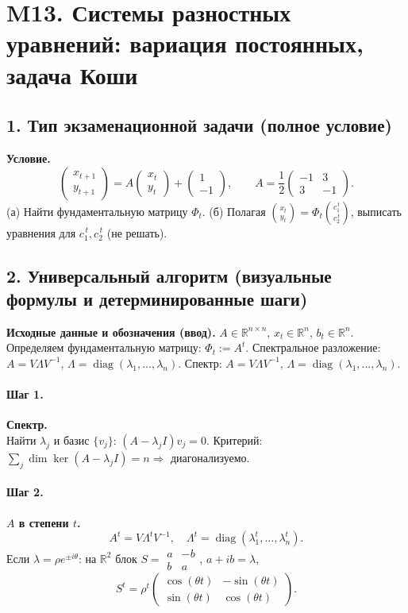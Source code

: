 \section{M13. Системы разностных уравнений: вариация постоянных, задача Коши}

\subsection*{1. Тип экзаменационной задачи (полное условие)}
\textbf{Условие.}
\[
\begin{pmatrix} x_{t+1}\\[2pt] y_{t+1} \end{pmatrix}
= A \begin{pmatrix} x_{t}\\[2pt] y_{t} \end{pmatrix}
+ \begin{pmatrix} 1\\[2pt] -1 \end{pmatrix}, 
\qquad 
A=\frac12\begin{pmatrix} -1 & 3\\[2pt] 3 & -1 \end{pmatrix}.
\]
(а) Найти фундаментальную матрицу \(\Phi_t\).
(б) Полагая \(\binom{x_t}{y_t}=\Phi_t\binom{c_1^{\,t}}{c_2^{\,t}}\), выписать уравнения для \(c_1^{\,t},c_2^{\,t}\) (не решать).

\subsection*{2. Универсальный алгоритм (визуальные формулы и детерминированные шаги)}
\textbf{Исходные данные и обозначения (ввод).} \(A\in\mathbb R^{n\times n}\), \(x_t\in\mathbb R^n\), \(b_t\in\mathbb R^n\). Определяем фундаментальную матрицу: \(\Phi_t:=A^t\). Спектральное разложение: \(A=V\Lambda V^{-1}\), \(\Lambda=\operatorname{diag}(\lambda_1,\dots,\lambda_n)\).
Спектр: \(A=V\Lambda V^{-1}\), \(\Lambda=\operatorname{diag}(\lambda_1,\dots,\lambda_n)\).

\paragraph{Шаг 1.} \textbf{Спектр.}\\
Найти \(\lambda_j\) и базис \(\{v_j\}\): \((A-\lambda_j I)v_j=0\). Критерий: \(\sum_j \dim\ker(A-\lambda_j I)=n\Rightarrow\) диагонализуемо.

\paragraph{Шаг 2.} \textbf{\(A\) в степени \(t\).}\\
\[
A^t=V\Lambda^tV^{-1},\quad \Lambda^t=\operatorname{diag}(\lambda_1^t,\dots,\lambda_n^t).
\]
Если \(\lambda=\rho e^{\pm i\theta}\): на \(\mathbb R^2\) блок \(S=\begin{smallmatrix}a&-b\\ b&a\end{smallmatrix}\), \(a+ib=\lambda\), 
\[
S^t=\rho^t\begin{pmatrix}\cos(\theta t)&-\sin(\theta t)\\ \sin(\theta t)&\cos(\theta t)\end{pmatrix}.
\]

